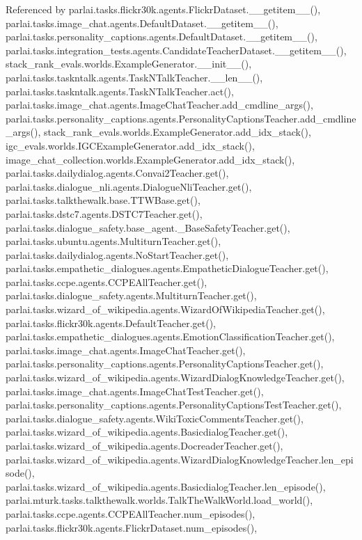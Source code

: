 Referenced by parlai.\+tasks.\+flickr30k.\+agents.\+Flickr\+Dataset.\+\_\+\+\_\+getitem\+\_\+\+\_\+(), parlai.\+tasks.\+image\+\_\+chat.\+agents.\+Default\+Dataset.\+\_\+\+\_\+getitem\+\_\+\+\_\+(), parlai.\+tasks.\+personality\+\_\+captions.\+agents.\+Default\+Dataset.\+\_\+\+\_\+getitem\+\_\+\+\_\+(), parlai.\+tasks.\+integration\+\_\+tests.\+agents.\+Candidate\+Teacher\+Dataset.\+\_\+\+\_\+getitem\+\_\+\+\_\+(), stack\+\_\+rank\+\_\+evals.\+worlds.\+Example\+Generator.\+\_\+\+\_\+init\+\_\+\+\_\+(), parlai.\+tasks.\+taskntalk.\+agents.\+Task\+N\+Talk\+Teacher.\+\_\+\+\_\+len\+\_\+\+\_\+(), parlai.\+tasks.\+taskntalk.\+agents.\+Task\+N\+Talk\+Teacher.\+act(), parlai.\+tasks.\+image\+\_\+chat.\+agents.\+Image\+Chat\+Teacher.\+add\+\_\+cmdline\+\_\+args(), parlai.\+tasks.\+personality\+\_\+captions.\+agents.\+Personality\+Captions\+Teacher.\+add\+\_\+cmdline\+\_\+args(), stack\+\_\+rank\+\_\+evals.\+worlds.\+Example\+Generator.\+add\+\_\+idx\+\_\+stack(), igc\+\_\+evals.\+worlds.\+I\+G\+C\+Example\+Generator.\+add\+\_\+idx\+\_\+stack(), image\+\_\+chat\+\_\+collection.\+worlds.\+Example\+Generator.\+add\+\_\+idx\+\_\+stack(), parlai.\+tasks.\+dailydialog.\+agents.\+Convai2\+Teacher.\+get(), parlai.\+tasks.\+dialogue\+\_\+nli.\+agents.\+Dialogue\+Nli\+Teacher.\+get(), parlai.\+tasks.\+talkthewalk.\+base.\+T\+T\+W\+Base.\+get(), parlai.\+tasks.\+dstc7.\+agents.\+D\+S\+T\+C7\+Teacher.\+get(), parlai.\+tasks.\+dialogue\+\_\+safety.\+base\+\_\+agent.\+\_\+\+Base\+Safety\+Teacher.\+get(), parlai.\+tasks.\+ubuntu.\+agents.\+Multiturn\+Teacher.\+get(), parlai.\+tasks.\+dailydialog.\+agents.\+No\+Start\+Teacher.\+get(), parlai.\+tasks.\+empathetic\+\_\+dialogues.\+agents.\+Empathetic\+Dialogue\+Teacher.\+get(), parlai.\+tasks.\+ccpe.\+agents.\+C\+C\+P\+E\+All\+Teacher.\+get(), parlai.\+tasks.\+dialogue\+\_\+safety.\+agents.\+Multiturn\+Teacher.\+get(), parlai.\+tasks.\+wizard\+\_\+of\+\_\+wikipedia.\+agents.\+Wizard\+Of\+Wikipedia\+Teacher.\+get(), parlai.\+tasks.\+flickr30k.\+agents.\+Default\+Teacher.\+get(), parlai.\+tasks.\+empathetic\+\_\+dialogues.\+agents.\+Emotion\+Classification\+Teacher.\+get(), parlai.\+tasks.\+image\+\_\+chat.\+agents.\+Image\+Chat\+Teacher.\+get(), parlai.\+tasks.\+personality\+\_\+captions.\+agents.\+Personality\+Captions\+Teacher.\+get(), parlai.\+tasks.\+wizard\+\_\+of\+\_\+wikipedia.\+agents.\+Wizard\+Dialog\+Knowledge\+Teacher.\+get(), parlai.\+tasks.\+image\+\_\+chat.\+agents.\+Image\+Chat\+Test\+Teacher.\+get(), parlai.\+tasks.\+personality\+\_\+captions.\+agents.\+Personality\+Captions\+Test\+Teacher.\+get(), parlai.\+tasks.\+dialogue\+\_\+safety.\+agents.\+Wiki\+Toxic\+Comments\+Teacher.\+get(), parlai.\+tasks.\+wizard\+\_\+of\+\_\+wikipedia.\+agents.\+Basicdialog\+Teacher.\+get(), parlai.\+tasks.\+wizard\+\_\+of\+\_\+wikipedia.\+agents.\+Docreader\+Teacher.\+get(), parlai.\+tasks.\+wizard\+\_\+of\+\_\+wikipedia.\+agents.\+Wizard\+Dialog\+Knowledge\+Teacher.\+len\+\_\+episode(), parlai.\+tasks.\+wizard\+\_\+of\+\_\+wikipedia.\+agents.\+Basicdialog\+Teacher.\+len\+\_\+episode(), parlai.\+mturk.\+tasks.\+talkthewalk.\+worlds.\+Talk\+The\+Walk\+World.\+load\+\_\+world(), parlai.\+tasks.\+ccpe.\+agents.\+C\+C\+P\+E\+All\+Teacher.\+num\+\_\+episodes(), parlai.\+tasks.\+flickr30k.\+agents.\+Flickr\+Dataset.\+num\+\_\+episodes(), 